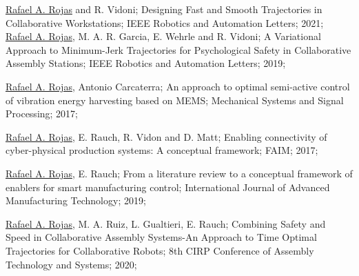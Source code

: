 \addpublication%
{%
    \underline{Rafael A. Rojas} and R. Vidoni;%
    Designing Fast and Smooth Trajectories in Collaborative Workstations;%
    IEEE Robotics and Automation Letters;%
    2021;%
}
\addpublication%
{%
    \underline{Rafael A. Rojas}, M. A. R. Garcia, E. Wehrle and R. Vidoni;%
    A Variational Approach to Minimum-Jerk Trajectories for Psychological Safety in Collaborative Assembly Stations;%
    IEEE Robotics and Automation Letters;%
    2019;%
}

\addpublication%
{%
    \underline{Rafael A. Rojas}, Antonio Carcaterra;%
    An approach to optimal semi-active control of vibration energy harvesting based on MEMS;%
    Mechanical Systems and Signal Processing;%
    2017;%
}

\addpublication%
{%
    \underline{Rafael A. Rojas}, E. Rauch, R. Vidon and D. Matt;%
    Enabling connectivity of cyber-physical production systems: A conceptual framework;%
    FAIM;%
    2017;%
}

\addpublication%
{%
    \underline{Rafael A. Rojas}, E. Rauch;%
    From a literature review to a conceptual framework of enablers for smart manufacturing control;
    International Journal of Advanced Manufacturing Technology;%
    2019;%
}

\addpublication%
{%
    \underline{Rafael A. Rojas}, M. A. Ruiz, L. Gualtieri, E. Rauch;%
    Combining Safety and Speed in Collaborative Assembly Systems-An Approach to Time Optimal Trajectories for Collaborative Robots;
    8th CIRP Conference of Assembly Technology and Systems;
    2020;%
}
